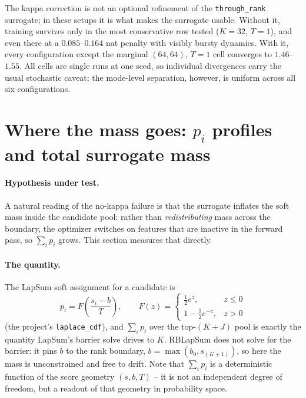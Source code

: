 \documentclass[11pt,a4paper]{article}
\newcommand{\code}[1]{\texttt{#1}}
\begin{document}
The kappa correction is not an optional refinement of the
\code{through\_rank} surrogate; in these setups it is what makes the
surrogate usable. Without it, training survives only in the most
conservative row tested ($K=32$, $T=1$), and even there at a
$0.085$--$0.164$ nat penalty with visibly bursty dynamics. With it, every
configuration except the marginal $(64,64)$, $T=1$ cell converges to
$1.46$--$1.55$. All cells are single runs at one seed, so individual
divergences carry the usual stochastic caveat; the mode-level separation,
however, is uniform across all six configurations.

\section{Where the mass goes: $p_i$ profiles and total surrogate mass}

\paragraph{Hypothesis under test.}
A natural reading of the no-kappa failure is that the surrogate inflates the
soft mass inside the candidate pool: rather than \emph{redistributing} mass
across the boundary, the optimizer switches on features that are inactive in
the forward pass, so $\sum_i p_i$ grows. This section measures that directly.

\paragraph{The quantity.}
The LapSum soft assignment for a candidate is
\[
p_i = F\!\left(\frac{s_i - b}{T}\right),\qquad
F(z)=\begin{cases}\tfrac12 e^{z}, & z\le 0\\[2pt] 1-\tfrac12 e^{-z}, & z>0\end{cases}
\]
(the project's \code{laplace\_cdf}), and $\sum_i p_i$ over the top-$(K+J)$
pool is exactly the quantity LapSum's barrier solve drives to $K$. RBLapSum
does not solve for the barrier: it pins $b$ to the rank boundary,
$b=\max(b_0, s_{(K+1)})$, so here the mass is unconstrained and free to
drift. Note that $\sum_i p_i$ is a deterministic function of the score
geometry $(s, b, T)$ -- it is not an independent degree of freedom, but a
readout of that geometry in probability space.
\end{document}

